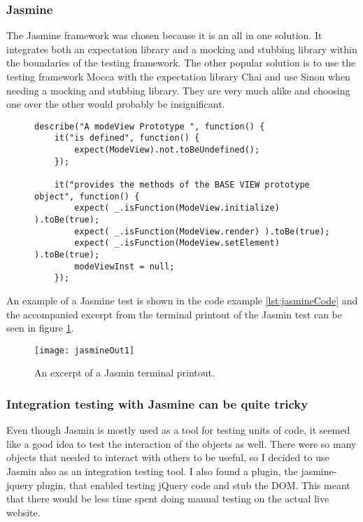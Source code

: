 \documentclass[english]{ifimaster}
\begin{document}
\subsubsection{Jasmine}
\label{sec:jasmine}
The Jasmine framework was chosen because it is an all in one solution. It integrates both an expectation library and a mocking and stubbing library within the boundaries of the testing framework. The other popular solution is to use the testing framework Mocca with the expectation library Chai and use Sinon when needing a mocking and stubbing library. They are very much alike and choosing one over the other would probably be insignificant. 



\begin{figure}
\begin{lstlisting}[caption=Example of behavior-driven development using Jasmine., label=lst:jasmineCode]
  describe("A modeView Prototype ", function() {
    it("is defined", function() {
        expect(ModeView).not.toBeUndefined();
    });
    
    it("provides the methods of the BASE VIEW prototype object", function() {
        expect( _.isFunction(ModeView.initialize) ).toBe(true);
        expect( _.isFunction(ModeView.render) ).toBe(true);
        expect( _.isFunction(ModeView.setElement) ).toBe(true);
        modeViewInst = null;
    });
\end{lstlisting}
\end{figure}
An example of a Jasmine test is shown in the code example \ref{lst:jasmineCode} and the accompanied excerpt from the terminal printout of the Jasmin test can be seen in figure \ref{fig:jasmineOut1}.
\begin{figure}
\centering
\texttt{[image: jasmineOut1]}
\caption{An excerpt of a Jasmin terminal printout.}
\label{fig:jasmineOut1}
\end{figure}


\subsubsection{Integration testing with Jasmine can be quite tricky}
Even though Jasmin is mostly used as a tool for testing units of code, it seemed like a good idea to test the interaction of the objects as well. There were so many objects that needed to interact with others to be useful, so I decided to use Jasmin also as an integration testing tool. I also found a plugin, the jasmine-jquery plugin, that enabled testing jQuery code and stub the DOM. This meant that there would be less time spent doing manual testing on the actual live website. 
\end{document}
